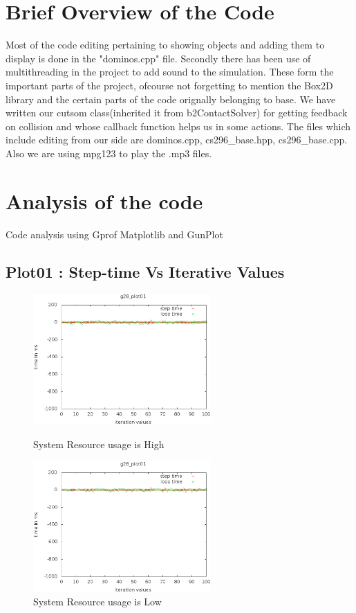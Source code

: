 \documentclass[a4paper,11pt]{article}
\begin{document}
\section{Brief Overview of the Code}
	Most of the code editing pertaining to showing objects and adding them to display is done in the "dominos.cpp" file. Secondly there has been use of multithreading in the project to add sound to the simulation. These form the important parts of the project, ofcourse not forgetting to mention the Box2D library and the certain parts of the code orignally belonging to base.
	We have written our cutsom class(inherited it from b2ContactSolver) for getting feedback on collision and whose callback function helps us in some actions. 
	The files which include editing from our side are dominos.cpp, cs296\_base.hpp, cs296\_base.cpp. Also we are using mpg123 to play the .mp3 files.

\section{Analysis of the code}
Code analysis using Gprof Matplotlib and GunPlot
\subsection{Plot01 : Step-time Vs Iterative Values}
 	\begin{figure}[ht]
	\begin{minipage}[ht]{0.5\linewidth}
	\includegraphics[height=50mm]{plots/g28_plot01.eps}
	\caption{System Resource usage is High }	
	\label{fig:ResourceIntensivePlot01}
	\end{minipage}	
	\begin{minipage}[ht]{0.5\linewidth}
	\includegraphics[height=50mm]{plots1/g28_plot01.eps}
	\caption{System Resource usage is Low}
	\label{fig:ResourceIntensivePlot01a}
	\end{minipage}	
	\end{figure}
\end{document}
